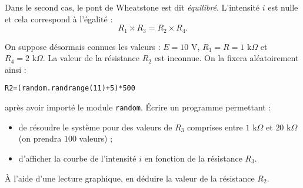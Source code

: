 Dans le second cas, le pont de Wheatstone est dit \textit{équilibré}. L'intensité $i$ est nulle et cela correspond à l'égalité :
\[ R_1\times R_3=R_2\times R_4. \]

\question{} On suppose désormais connues les valeurs : $E = 10$ V, $R_1 = R = 1 \text{ k} \Omega$ et $R_4= 2 \text{ k} \Omega$. La valeur de la résistance $R_2$ est inconnue. On la fixera aléatoirement ainsi :
		\begin{center}
			\texttt{R2=(random.randrange(11)+5)*500}
		\end{center}
		
\question{} après avoir importé le module \texttt{random}. \'{E}crire un programme permettant :
				\begin{itemize}
					\medskip\item[\textbullet] de résoudre le système pour des valeurs de $R_3$ comprises entre $1\text{ k} \Omega$ et $20\text{ k} \Omega$ (on prendra $100$ valeurs) ;
					\medskip\item[\textbullet] d'afficher la courbe de l'intensité $i$ en fonction de la résistance $R_3$.
				\end{itemize}

\question{} \`{A} l'aide d'une lecture graphique, en déduire la valeur de la résistance $R_2$.

